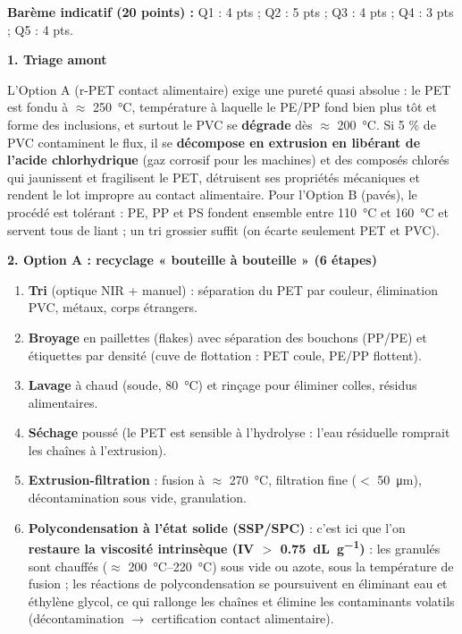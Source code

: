 \documentclass[11pt]{article}
\begin{document}
\begin{corrige}
\textbf{Barème indicatif (20 points) :} Q1 : 4 pts ; Q2 : 5 pts ; Q3 : 4 pts ; Q4 : 3 pts ; Q5 : 4 pts.

\textbf{1. Triage amont}

L'Option A (r-PET contact alimentaire) exige une pureté quasi absolue : le PET est fondu à $\approx$ \SI{250}{\celsius}, température à laquelle le PE/PP fond bien plus tôt et forme des inclusions, et surtout le PVC se \textbf{dégrade} dès $\approx$ \SI{200}{\celsius}. Si 5 \% de PVC contaminent le flux, il se \textbf{décompose en extrusion en libérant de l'acide chlorhydrique } (gaz corrosif pour les machines) et des composés chlorés qui jaunissent et fragilisent le PET, détruisent ses propriétés mécaniques et rendent le lot impropre au contact alimentaire. Pour l'Option B (pavés), le procédé est tolérant : PE, PP et PS fondent ensemble entre \SI{110}{\celsius} et \SI{160}{\celsius} et servent tous de liant ; un tri grossier suffit (on écarte seulement PET et PVC).

\textbf{2. Option A : recyclage « bouteille à bouteille » (6 étapes)}
\begin{enumerate}
    \item \textbf{Tri} (optique NIR + manuel) : séparation du PET par couleur, élimination PVC, métaux, corps étrangers.
    \item \textbf{Broyage} en paillettes (flakes) avec séparation des bouchons (PP/PE) et étiquettes par densité (cuve de flottation : PET coule, PE/PP flottent).
    \item \textbf{Lavage} à chaud (soude, \SI{80}{\celsius}) et rinçage pour éliminer colles, résidus alimentaires.
    \item \textbf{Séchage} poussé (le PET est sensible à l'hydrolyse : l'eau résiduelle romprait les chaînes à l'extrusion).
    \item \textbf{Extrusion-filtration} : fusion à $\approx$ \SI{270}{\celsius}, filtration fine ($<$ \SI{50}{\micro\meter}), décontamination sous vide, granulation.
    \item \textbf{Polycondensation à l'état solide (SSP/SPC)} : c'est ici que l'on \textbf{restaure la viscosité intrinsèque (IV $>$ \SI{0,75}{\deci\liter\per\gram})} : les granulés sont chauffés ($\approx$ \SI{200}{\celsius}--\SI{220}{\celsius}) sous vide ou azote, sous la température de fusion ; les réactions de polycondensation se poursuivent en éliminant eau et éthylène glycol, ce qui rallonge les chaînes et élimine les contaminants volatils (décontamination $\to$ certification contact alimentaire).
\end{enumerate}


\end{corrige}
\end{document}
